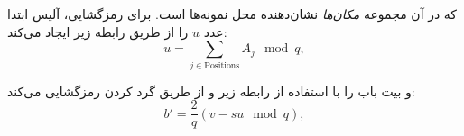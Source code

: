 که در آن مجموعه \textit{مکان‌ها} نشان‌دهنده محل نمونه‌ها است. برای رمزگشایی، آلیس ابتدا عدد $u$ را از طریق رابطه زیر ایجاد می‌کند:
\begin{equation}
	u = \sum_{j \in \text{Positions}} A_j \mod q,
	\label{eq:12-3}
\end{equation}

و بیت باب را با استفاده از رابطه زیر و از طریق گرد کردن رمزگشایی می‌کند:
\begin{equation}
	b' = \frac{2}{q}\left(v - su \mod q\right),
	\label{eq:12-5}
\end{equation}














